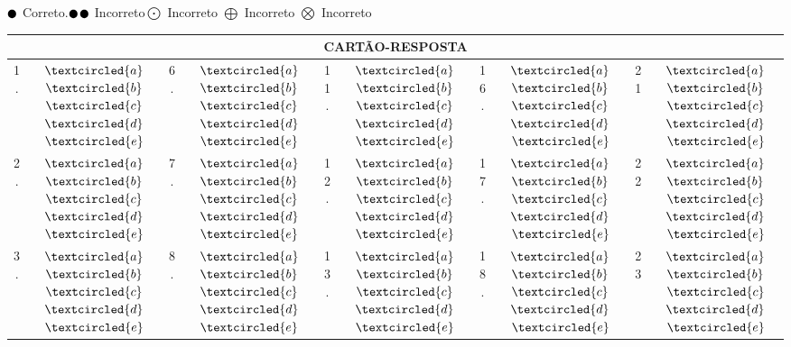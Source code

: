 \documentclass[14pt]{report}
\begin{document}
$\newmoon$ Correto.\hspace{2cm}$\newmoon$$\newmoon$ Incorreto\hspace{2cm}$\bigodot$ Incorreto\hspace{2cm} $\bigoplus$ Incorreto\hspace{2cm} $\bigotimes$ Incorreto
\Large
\begin{center}
\begin{tabular}{ |c|c|c|c|c|c|c|c|c|c|}
 \hline
 \multicolumn{10}{|c|}{\vspace*{1cm}\LARGE{\textbf{CARTÃO-RESPOSTA}}}\\
 \hline
 \hline
 1. & $\textcircled{a}$$\textcircled{b}$$\textcircled{c}$$\textcircled{d}$$\textcircled{e}$&6.&$\textcircled{a}$$\textcircled{b}$$\textcircled{c}$$\textcircled{d}$$\textcircled{e}$&11.&$\textcircled{a}$$\textcircled{b}$$\textcircled{c}$$\textcircled{d}$$\textcircled{e}$&16.&$\textcircled{a}$$\textcircled{b}$$\textcircled{c}$$\textcircled{d}$$\textcircled{e}$&21&$\textcircled{a}$$\textcircled{b}$$\textcircled{c}$$\textcircled{d}$$\textcircled{e}$ \\
2. & $\textcircled{a}$$\textcircled{b}$$\textcircled{c}$$\textcircled{d}$$\textcircled{e}$&7.&$\textcircled{a}$$\textcircled{b}$$\textcircled{c}$$\textcircled{d}$$\textcircled{e}$&12.&$\textcircled{a}$$\textcircled{b}$$\textcircled{c}$$\textcircled{d}$$\textcircled{e}
$&17.&$\textcircled{a}$$\textcircled{b}$$\textcircled{c}$$\textcircled{d}$$\textcircled{e}$&22&$\textcircled{a}$$\textcircled{b}$$\textcircled{c}$$\textcircled{d}$$\textcircled{e}$ \\
 3. & $\textcircled{a}$$\textcircled{b}$$\textcircled{c}$$\textcircled{d}$$\textcircled{e}$&8.&$\textcircled{a}$$\textcircled{b}$$\textcircled{c}$$\textcircled{d}$$\textcircled{e}$&13.&$\textcircled{a}$$\textcircled{b}$$\textcircled{c}$$\textcircled{d}$$\textcircled{e}$&18.&$\textcircled{a}$$\textcircled{b}$$\textcircled{c}$$\textcircled{d}$$\textcircled{e}$&23&$\textcircled{a}$$\textcircled{b}$$\textcircled{c}$$\textcircled{d}$$\textcircled{e}$ \\

\end{tabular}
\end{center}$$
\end{document}

